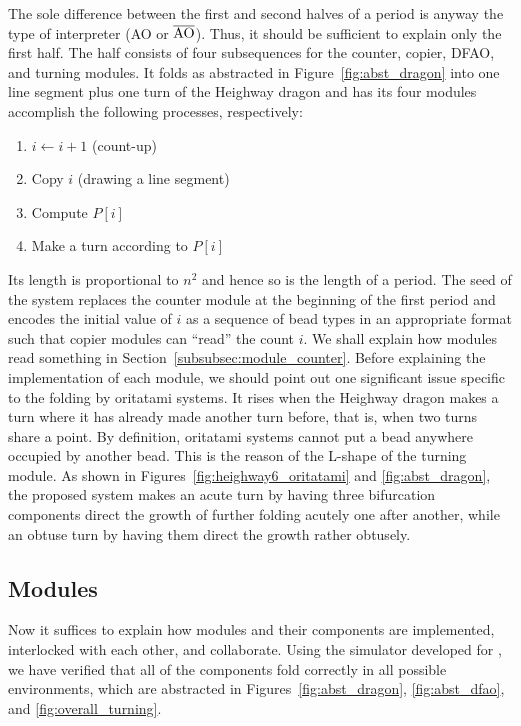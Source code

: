 \documentclass{article}
\theoremstyle{remark}
\begin{document}
The sole difference between the first and second halves of a period is anyway the type of interpreter (AO or $\overline{\rm AO}$). 
Thus, it should be sufficient to explain only the first half. 
The half consists of four subsequences for the counter, copier, DFAO, and turning modules. 
It folds as abstracted in Figure~\ref{fig:abst_dragon} into one line segment plus one turn of the Heighway dragon and has its four modules accomplish the following processes, respectively: 
\begin{enumerate}[itemsep=0pt]
\item $i \gets i + 1$ (count-up)
\item Copy $i$ (drawing a line segment)
\item Compute $P[i]$
\item Make a turn according to $P[i]$
\end{enumerate}
Its length is proportional to $n^2$ and hence so is the length of a period. 
The seed of the system replaces the counter module at the beginning of the first period and encodes the initial value of $i$ as a sequence of bead types in an appropriate format such that copier modules can ``read'' the count $i$. 
We shall explain how modules read something in Section~\ref{subsubsec:module_counter}. 
Before explaining the implementation of each module, we should point out one significant issue specific to the folding by oritatami systems. 
It rises when the Heighway dragon makes a turn where it has already made another turn before, that is, when two turns share a point. 
By definition, oritatami systems cannot put a bead anywhere occupied by another bead. 
This is the reason of the L-shape of the turning module. 
As shown in Figures~\ref{fig:heighway6_oritatami} and \ref{fig:abst_dragon}, the proposed system makes an acute turn by having three bifurcation components direct the growth of further folding acutely one after another, while an obtuse turn by having them direct the growth rather obtusely. 

		\subsection{Modules}

Now it suffices to explain how modules and their components are implemented, interlocked with each other, and collaborate. 
Using the simulator developed for \cite{HaKiOtSe2016}, we have verified that all of the components fold correctly in all possible environments, which are abstracted in Figures~\ref{fig:abst_dragon}, \ref{fig:abst_dfao}, and \ref{fig:overall_turning}. 
\end{document}
